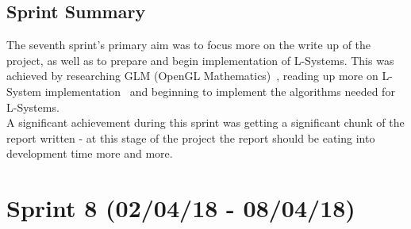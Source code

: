 \documentclass[a4paper,10pt]{report}
\begin{document}
\subsection{Sprint Summary}

The seventh sprint's primary aim was to focus more on the write up of the project, as well as to prepare and begin implementation of L-Systems. This was achieved by researching GLM (OpenGL Mathematics)~\cite{creation2016opengl}, reading up more on L-System implementation~\cite{prusinkiewicz2012algorithmic} and beginning to implement the algorithms needed for L-Systems.\\

A significant achievement during this sprint was getting a significant chunk of the report written - at this stage of the project the report should be eating into development time more and more.
\clearpage


\section{Sprint 8 (02/04/18 -  08/04/18)}
\end{document}
